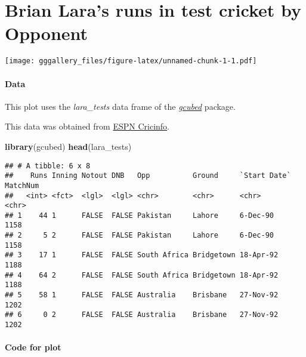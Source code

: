 \documentclass[]{book}
\newenvironment{Shaded}{\begin{snugshade}}{\end{snugshade}}
\newcommand{\KeywordTok}[1]{\textcolor[rgb]{0.13,0.29,0.53}{\textbf{#1}}}
\newcommand{\NormalTok}[1]{#1}
\begin{document}
\leavevmode\hypertarget{nhanestn}{}%

\leavevmode\hypertarget{chideptboxtn}{}%

\leavevmode\hypertarget{chiridgestn}{}%

\hypertarget{lara}{%
\chapter*{Brian Lara's runs in test cricket by Opponent}\label{lara}}

\texttt{[image: gggallery\_files/figure-latex/unnamed-chunk-1-1.pdf]}

\hypertarget{laradata}{%
\subsubsection*{Data}\label{laradata}}

This plot uses the \emph{lara\_tests} data frame of the \protect\hyperlink{gcubed}{\emph{gcubed}} package.

This data was obtained from \href{http://stats.espncricinfo.com/ci/engine/player/52337.html?class=1;template=results;type=batting;view=innings}{ESPN Cricinfo}.

\begin{Shaded}
\begin{Highlighting}[]
\KeywordTok{library}\NormalTok{(gcubed)}
\KeywordTok{head}\NormalTok{(lara_tests)}
\end{Highlighting}
\end{Shaded}

\begin{verbatim}
## # A tibble: 6 x 8
##    Runs Inning Notout DNB   Opp          Ground     `Start Date` MatchNum
##   <int> <fct>  <lgl>  <lgl> <chr>        <chr>      <chr>        <chr>   
## 1    44 1      FALSE  FALSE Pakistan     Lahore     6-Dec-90     1158    
## 2     5 2      FALSE  FALSE Pakistan     Lahore     6-Dec-90     1158    
## 3    17 1      FALSE  FALSE South Africa Bridgetown 18-Apr-92    1188    
## 4    64 2      FALSE  FALSE South Africa Bridgetown 18-Apr-92    1188    
## 5    58 1      FALSE  FALSE Australia    Brisbane   27-Nov-92    1202    
## 6     0 2      FALSE  FALSE Australia    Brisbane   27-Nov-92    1202
\end{verbatim}

\hypertarget{laracode}{%
\subsubsection*{Code for plot}\label{laracode}}
\end{document}
